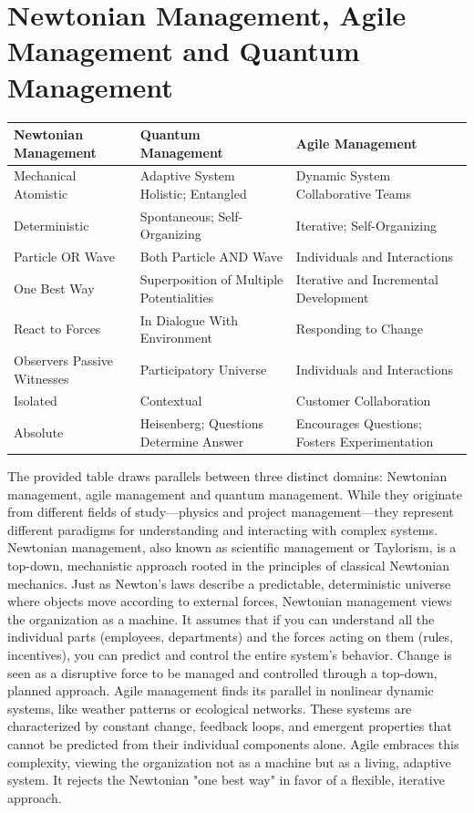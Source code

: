 \documentclass{article}
\begin{document}
\section{Newtonian Management, Agile Management and Quantum Management}
\label{sec2}
\begin{center}
\begin{tabular}{|>{\RaggedRight}p{5cm}|>{\RaggedRight}p{5cm}|>{\RaggedRight}p{5cm}|}
\hline
\textbf{Newtonian Management} & \textbf{Quantum Management} & \textbf{Agile Management}\\
\hline
Mechanical Atomistic & Adaptive System Holistic; Entangled & Dynamic System Collaborative Teams \\
\hline
Deterministic & Spontaneous; Self-Organizing & Iterative; Self-Organizing \\
\hline
Particle OR Wave & Both Particle AND Wave & Individuals and Interactions \\
\hline
One Best Way & Superposition of Multiple Potentialities & Iterative and Incremental Development \\
\hline
React to Forces & In Dialogue With Environment & Responding to Change \\
\hline
Observers Passive Witnesses & Participatory Universe & Individuals and Interactions \\
\hline
Isolated & Contextual & Customer Collaboration \\
\hline
Absolute & Heisenberg; Questions Determine Answer & Encourages Questions; Fosters Experimentation \\
\hline
\end{tabular}
\end{center}
The provided table \cite{zohar2021zerodistance} draws parallels between three distinct domains: Newtonian management, agile management and quantum management. While they originate from different fields of study—physics and project management—they represent different paradigms for understanding and interacting with complex systems.
Newtonian management, also known as scientific management or Taylorism, is a top-down, mechanistic approach rooted in the principles of classical Newtonian mechanics. Just as Newton's laws describe a predictable, deterministic universe where objects move according to external forces, Newtonian management views the organization as a machine. It assumes that if you can understand all the individual parts (employees, departments) and the forces acting on them (rules, incentives), you can predict and control the entire system's behavior. Change is seen as a disruptive force to be managed and controlled through a top-down, planned approach. Agile management finds its parallel in nonlinear dynamic systems, like weather patterns or ecological networks. These systems are characterized by constant change, feedback loops, and emergent properties that cannot be predicted from their individual components alone. Agile embraces this complexity, viewing the organization not as a machine but as a living, adaptive system. It rejects the Newtonian "one best way" in favor of a flexible, iterative approach. 
\end{document}
